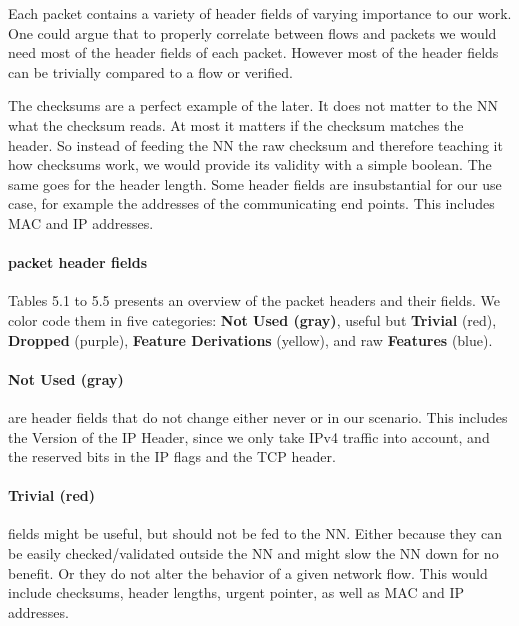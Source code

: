 \documentclass[
	ngerman,
	ruledheaders=section,%
	class=report,%
	thesis={type=bachelor},%
	accentcolor=9c,%
	custommargins=true,%
	marginpar=false,%
	parskip=half-,%
	fontsize=11pt,%
]{tudapub}
\begin{document}
Each packet contains a variety of header fields of varying importance to our work.
One could argue that to properly correlate between flows and packets we would need most of the header fields of each packet.
However most of the header fields can be trivially compared to a flow or verified.

The checksums are a perfect example of the later.
It does not matter to the NN what the checksum reads.
At most it matters if the checksum matches the header.
So instead of feeding the NN the raw checksum and therefore teaching it how checksums work, we would provide its validity with a simple boolean.
The same goes for the header length.
Some header fields are insubstantial for our use case, for example the addresses of the communicating end points.
This includes MAC and IP addresses.

\paragraph{packet header fields}
Tables 5.1 to 5.5 presents an overview of the packet headers and their fields.
We color code them in five categories:
\colorbox{not}{\textbf{{Not Used} (gray)}},
useful but \colorbox{trivial}{\textbf{Trivial} (red)},
\colorbox{dropped}{\textbf{Dropped} (purple)},
\colorbox{derivation}{\textbf{Feature Derivations} (yellow)},
and raw \colorbox{feature}{\textbf{Features} (blue)}.

\paragraph{\colorbox{not}{\textbf{{Not Used} (gray)}}} are header fields that do not change either never or in our scenario.
This includes the Version of the IP Header, since we only take IPv4 traffic into account,
and the reserved bits in the IP flags and the TCP header.

\paragraph{\colorbox{trivial}{\textbf{Trivial} (red)}} fields might be useful, but should not be fed to the NN.
Either because they can be easily checked/validated outside the NN and might slow the NN down for no benefit.
Or they do not alter the behavior of a given network flow.
This would include checksums, header lengths, urgent pointer, as well as MAC and IP addresses.
\end{document}
